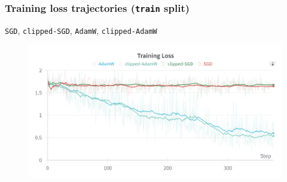 \begin{frame}
    \frametitle{Training loss trajectories (\texttt{train} split)}
    \texttt{SGD}, \texttt{clipped-SGD}, \texttt{AdamW}, \texttt{clipped-AdamW}
    \begin{figure}[htpb]
        \begin{center}
            \includegraphics[width=\linewidth]
                {pics/experiments/train_loss_adam_sgd}
        \end{center}
    \end{figure}
\end{frame}
